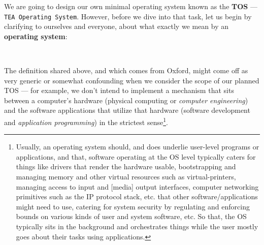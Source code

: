 \documentclass[a4paper, 18pt]{book} %
\begin{document}
{{{We are going to design our own minimal operating system known as the \textbf{TOS} --- \texttt{TEA Operating System}. However, before we dive into that task, let us begin by clarifying to ourselves and everyone, about what exactly we mean by an \textbf{operating system}:

\vspace{2em}


\begin{center}
\\
\end{center}

\vspace{2em}


The definition shared above, and which comes from Oxford\cite{illingworth1996computing}, might come off as very generic or somewhat confounding when we consider the scope of our planned TOS --- for example, we don't intend to implement a mechanism that sits between a computer's hardware (physical computing or \textit{computer engineering}) and  the software applications that utilize that hardware (software development and \textit{application programming}) in the strictest sense\footnote{Usually, an operating system should, and does underlie user-level programs or applications, and that, software operating at the OS level typically caters for things like drivers that render the hardware usable, bootstrapping and managing memory and other virtual resources such as virtual-printers, managing access to input and [media] output interfaces, computer networking primitives such as the IP protocol stack, etc. that other software/applications might need to use, catering for system security by regulating and enforcing bounds on various kinds of user and system software, etc. So that, the OS typically sits in the background and orchestrates things while the user mostly goes about their tasks using applications.}.


}}}
\end{document}
